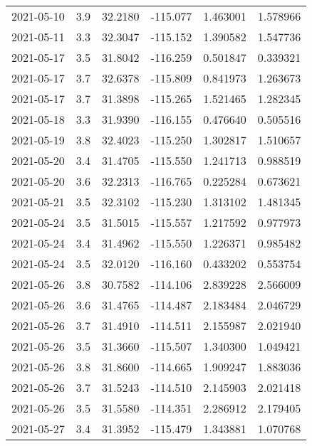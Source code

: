\begin{tabular}{lrrrrr}
2021-05-10 &       3.9 &  32.2180 &  -115.077 &         1.463001 &         1.578966 \\
2021-05-11 &       3.3 &  32.3047 &  -115.152 &         1.390582 &         1.547736 \\
2021-05-17 &       3.5 &  31.8042 &  -116.259 &         0.501847 &         0.339321 \\
2021-05-17 &       3.7 &  32.6378 &  -115.809 &         0.841973 &         1.263673 \\
2021-05-17 &       3.7 &  31.3898 &  -115.265 &         1.521465 &         1.282345 \\
2021-05-18 &       3.3 &  31.9390 &  -116.155 &         0.476640 &         0.505516 \\
2021-05-19 &       3.8 &  32.4023 &  -115.250 &         1.302817 &         1.510657 \\
2021-05-20 &       3.4 &  31.4705 &  -115.550 &         1.241713 &         0.988519 \\
2021-05-20 &       3.6 &  32.2313 &  -116.765 &         0.225284 &         0.673621 \\
2021-05-21 &       3.5 &  32.3102 &  -115.230 &         1.313102 &         1.481345 \\
2021-05-24 &       3.5 &  31.5015 &  -115.557 &         1.217592 &         0.977973 \\
2021-05-24 &       3.4 &  31.4962 &  -115.550 &         1.226371 &         0.985482 \\
2021-05-24 &       3.5 &  32.0120 &  -116.160 &         0.433202 &         0.553754 \\
2021-05-26 &       3.8 &  30.7582 &  -114.106 &         2.839228 &         2.566009 \\
2021-05-26 &       3.6 &  31.4765 &  -114.487 &         2.183484 &         2.046729 \\
2021-05-26 &       3.7 &  31.4910 &  -114.511 &         2.155987 &         2.021940 \\
2021-05-26 &       3.5 &  31.3660 &  -115.507 &         1.340300 &         1.049421 \\
2021-05-26 &       3.8 &  31.8600 &  -114.665 &         1.909247 &         1.883036 \\
2021-05-26 &       3.7 &  31.5243 &  -114.510 &         2.145903 &         2.021418 \\
2021-05-26 &       3.5 &  31.5580 &  -114.351 &         2.286912 &         2.179405 \\
2021-05-27 &       3.4 &  31.3952 &  -115.479 &         1.343881 &         1.070768 \\

\end{tabular}
